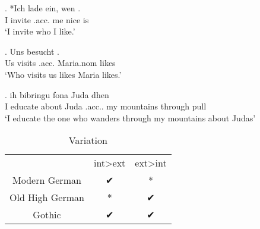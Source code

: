 \documentclass[11pt,hidelinks]{memoir}
\begin{document}
\exg. *Ich {lade ein}, wen   .\\
 I invite\scsub{[acc]} .\ac{acc}. me nice is\scsub{[nom]}\\
 `I invite who I like.' 

\exg. Uns besucht   .\\
 Us visits\scsub{[nom]} .\ac{acc}. Maria.\ac{nom} likes\scsub{[acc]}\\
 `Who visits us likes Maria likes.' \label{ex:mg-nom-acc}

\exg. ih bibringu fona Juda dhen   \\
 I educate\scsub{[acc]} about Juda .\ac{acc}.. my mountains {through pull}\scsub{[nom]}\\
 `I educate the one who wanders through my mountains about Judas' \label{ex:ohg-acc-nom}



\begin{table}[H]
	\center
	\caption {Variation}
		\begin{tabular}{ccc}
		\toprule
		 					      & \ac{int}>\ac{ext}		& \ac{ext}>\ac{int}	\\
								      \cmidrule{2-3}
		Modern German 	& ✔			 							&	*									\\
		Old High German	& *										&	✔									\\
		Gothic		      &	✔										&	✔									\\
		\bottomrule
		\end{tabular}
\end{table}
\end{document}
